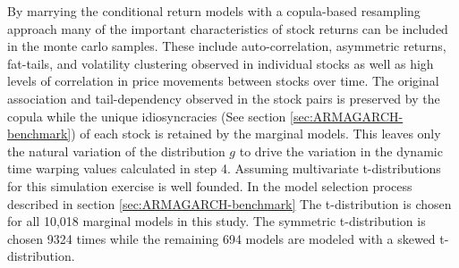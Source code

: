 \documentclass[12pt]{article}
\begin{document}
By marrying the conditional return models with a copula-based resampling approach many of the important characteristics of stock returns can be included in the monte carlo samples. These include auto-correlation, asymmetric returns, fat-tails, and volatility clustering observed in individual stocks as well as high levels of correlation in price movements between stocks over time. The original association and tail-dependency observed in the stock pairs is preserved by the copula while the unique idiosyncracies (See section \ref{sec:ARMAGARCH-benchmark}) of each stock is retained by the marginal models. This leaves only the natural variation of the distribution $g$ to drive the variation in the dynamic time warping values calculated in step 4. Assuming multivariate t-distributions for this simulation exercise is well founded. In the model selection process described in section \ref{sec:ARMAGARCH-benchmark} The t-distribution is chosen for all 10,018 marginal models in this study. The symmetric t-distribution is chosen 9324 times while the remaining 694 models are modeled with a skewed t-distribution.


\pagebreak
\end{document}
